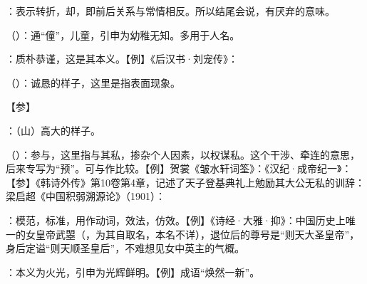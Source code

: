 {
\item {}：表示转折，却，即前后关系与常情相反。所以结尾会说，有厌弃的意味。
\item {}（）：通“僮”，儿童，引申为幼稚无知。多用于人名。

：质朴恭谨，这是其本义。【例】《后汉书·刘宠传》：
\item {}（）：诚恳的样子，这里是指表面现象。
}
{}


{
【参】 
}
{}


{
\item {}：（山）高大的样子。

\item {}（）：参与，这里指与其私，掺杂个人因素，以权谋私。这个干涉、牵连的意思，后来专写为“预”。可与作比较。【例】贺裳《皱水轩词筌》：《汉纪·成帝纪一》：【参】《韩诗外传》第10卷第4章，记述了天子登基典礼上勉励其大公无私的训辞：梁启超《中国积弱溯源论》（1901）：
}
{}


{
\item {}：模范，标准，用作动词，效法，仿效。【例】《诗经·大雅·抑》：中国历史上唯一的女皇帝武曌（，为其自取名，本名不详），退位后的尊号是“则天大圣皇帝”，身后定谥“则天顺圣皇后”，不难想见女中英主的气概。
\item {}：本义为火光，引申为光辉鲜明。【例】成语“焕然一新”。
}
{}


